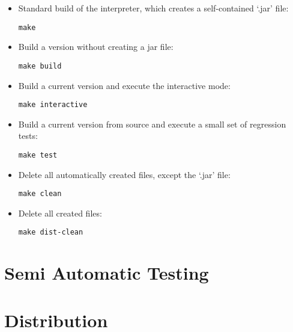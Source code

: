 \begin{itemize}
	\item Standard build of the interpreter, which creates a self-contained `.jar' file:
\begin{lstlisting}[frame=none,numbers=none]
make
\end{lstlisting}

	\item Build a version without creating a jar file:

\begin{lstlisting}[frame=none,numbers=none]
make build
\end{lstlisting}

	\item Build a current version and execute the interactive mode:

\begin{lstlisting}[frame=none,numbers=none]
make interactive
\end{lstlisting}

	\item Build a current version from source and execute a small set of regression tests:

\begin{lstlisting}[frame=none,numbers=none]
make test
\end{lstlisting}

	\item Delete all automatically created files, except the `.jar' file:

\begin{lstlisting}[frame=none,numbers=none]
make clean
\end{lstlisting}

	\item Delete all created files:

\begin{lstlisting}[frame=none,numbers=none]
make dist-clean
\end{lstlisting}

\end{itemize}

\section{Semi Automatic Testing}


\section{Distribution}

